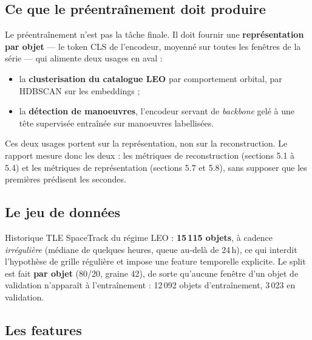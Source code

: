 \documentclass{article}
\begin{document}
\subsection{Ce que le préentraînement doit produire}

Le préentraînement n'est pas la tâche finale. Il doit fournir une \textbf{représentation par objet} --- le token CLS de l'encodeur, moyenné sur toutes les fenêtres de la série --- qui alimente deux usages en aval :
\begin{itemize}
    \item la \textbf{clusterisation du catalogue LEO} par comportement orbital, par HDBSCAN sur les embeddings ;
    \item la \textbf{détection de manoeuvres}, l'encodeur servant de \textit{backbone} gelé à une tête supervisée entraînée sur manoeuvres labellisées.
\end{itemize}

Ces deux usages portent sur la représentation, non sur la reconstruction. Le rapport mesure donc les deux : les métriques de reconstruction (sections 5.1 à 5.4) et les métriques de représentation (sections 5.7 et 5.8), sans supposer que les premières prédisent les secondes.

\subsection{Le jeu de données}

Historique TLE SpaceTrack du régime LEO : \textbf{15\,115 objets}, à cadence \emph{irrégulière} (médiane de quelques heures, queue au-delà de 24\,h), ce qui interdit l'hypothèse de grille régulière et impose une feature temporelle explicite. Le split est fait \textbf{par objet} (80/20, graine 42), de sorte qu'aucune fenêtre d'un objet de validation n'apparaît à l'entraînement : 12\,092 objets d'entraînement, 3\,023 en validation.

\subsection{Les features}
\end{document}

